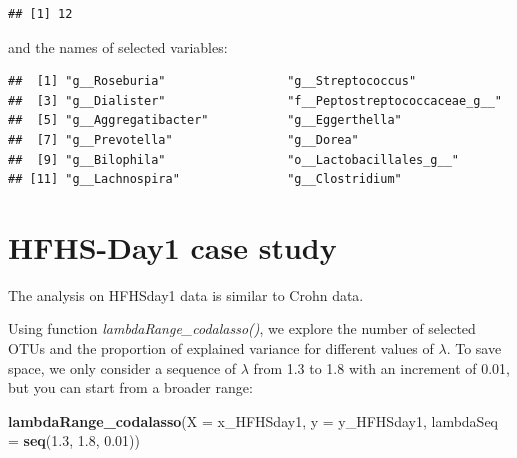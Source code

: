 \documentclass[openany]{book}
\newenvironment{Shaded}{\begin{snugshade}}{\end{snugshade}}
\newcommand{\KeywordTok}[1]{\textcolor[rgb]{0.13,0.29,0.53}{\textbf{#1}}}
\newcommand{\DataTypeTok}[1]{\textcolor[rgb]{0.13,0.29,0.53}{#1}}
\newcommand{\FloatTok}[1]{\textcolor[rgb]{0.00,0.00,0.81}{#1}}
\newcommand{\OperatorTok}[1]{\textcolor[rgb]{0.81,0.36,0.00}{\textbf{#1}}}
\newcommand{\NormalTok}[1]{#1}
\begin{document}
\begin{verbatim}
## [1] 12
\end{verbatim}

and the names of selected variables:

\begin{Shaded}
\end{Shaded}

\begin{verbatim}
##  [1] "g__Roseburia"                 "g__Streptococcus"            
##  [3] "g__Dialister"                 "f__Peptostreptococcaceae_g__"
##  [5] "g__Aggregatibacter"           "g__Eggerthella"              
##  [7] "g__Prevotella"                "g__Dorea"                    
##  [9] "g__Bilophila"                 "o__Lactobacillales_g__"      
## [11] "g__Lachnospira"               "g__Clostridium"
\end{verbatim}

\section{HFHS-Day1 case study}\label{hfhs-day1-case-study-2}

The analysis on HFHSday1 data is similar to Crohn data.

Using function \emph{lambdaRange\_codalasso()}, we explore the number of
selected OTUs and the proportion of explained variance for different
values of \(\lambda\). To save space, we only consider a sequence of
\(\lambda\) from 1.3 to 1.8 with an increment of 0.01, but you can start
from a broader range:

\begin{Shaded}
\begin{Highlighting}[]
\KeywordTok{lambdaRange_codalasso}\NormalTok{(}\DataTypeTok{X =}\NormalTok{ x_HFHSday1, }\DataTypeTok{y =}\NormalTok{ y_HFHSday1, }\DataTypeTok{lambdaSeq =} \KeywordTok{seq}\NormalTok{(}\FloatTok{1.3}\NormalTok{, }\FloatTok{1.8}\NormalTok{, }\FloatTok{0.01}\NormalTok{))}
\end{Highlighting}
\end{Shaded}
\end{document}
